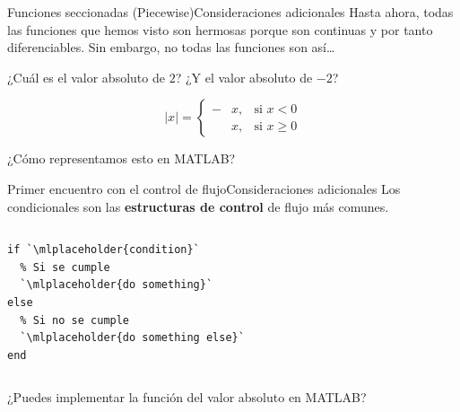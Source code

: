 \documentclass[spanish, c, handout]{beamer}
\begin{document}
\begin{frame}{Funciones seccionadas (Piecewise)}{Consideraciones adicionales}
    Hasta ahora, todas las funciones que hemos visto son hermosas porque son continuas y por tanto diferenciables.
    Sin embargo, no todas las funciones son así\dots \pause

    \bigskip

    ¿Cuál es el valor absoluto de $2$? \pause ¿Y el valor absoluto de $-2$? \pause

    $$|x| =\left\{ \begin{aligned}
        -&x , &\text{si } x < 0 \\
        &x ,  & \text{si } x \ge 0
    \end{aligned} \right.
    $$ \pause
    
    \bigskip

    ¿Cómo representamos esto en MATLAB?
\end{frame}

\begin{frame}[fragile]{Primer encuentro con el control de flujo}{Consideraciones adicionales}
    Los \alert{condicionales} son las \textbf{estructuras de control} de flujo más comunes.

    \bigskip

    \begin{columns}
        \begin{column}{0.95\linewidth}
\begin{lstlisting}
if `\mlplaceholder{condition}`
  % Si se cumple
  `\mlplaceholder{do something}`
else
  % Si no se cumple
  `\mlplaceholder{do something else}`
end
\end{lstlisting}
        \end{column}
        
    \end{columns}

\bigskip

¿Puedes implementar la función del valor absoluto en MATLAB?
\end{frame}




\end{document}
